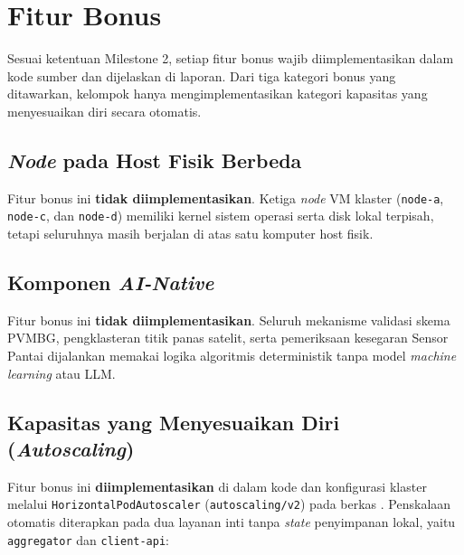 \section{Fitur Bonus}

Sesuai ketentuan Milestone 2, setiap fitur bonus wajib diimplementasikan dalam kode sumber dan dijelaskan di laporan. Dari tiga kategori bonus yang ditawarkan, kelompok hanya mengimplementasikan kategori kapasitas yang menyesuaikan diri secara otomatis.

\subsection{\textit{Node} pada Host Fisik Berbeda}

Fitur bonus ini \textbf{tidak diimplementasikan}. Ketiga \textit{node} VM klaster (\texttt{node-a}, \texttt{node-c}, dan \texttt{node-d}) memiliki kernel sistem operasi serta disk lokal terpisah, tetapi seluruhnya masih berjalan di atas satu komputer host fisik.

\subsection{Komponen \textit{AI-Native}}

Fitur bonus ini \textbf{tidak diimplementasikan}. Seluruh mekanisme validasi skema PVMBG, pengklasteran titik panas satelit, serta pemeriksaan kesegaran Sensor Pantai dijalankan memakai logika algoritmis deterministik tanpa model \textit{machine learning} atau LLM.

\subsection{Kapasitas yang Menyesuaikan Diri (\textit{Autoscaling})}

Fitur bonus ini \textbf{diimplementasikan} di dalam kode dan konfigurasi klaster melalui \texttt{HorizontalPodAutoscaler} (\texttt{autoscaling/v2}) pada berkas . Penskalaan otomatis diterapkan pada dua layanan inti tanpa \textit{state} penyimpanan lokal, yaitu \texttt{aggregator} dan \texttt{client-api}:

